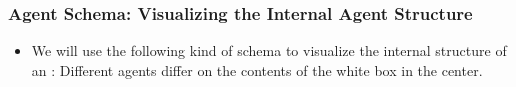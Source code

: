 \documentclass[notes,mh]{mikoslides}
\begin{document}
\begin{module}[id=agent-schema]

\begin{frame}
  \frametitle{Agent Schema: Visualizing the Internal Agent Structure}
  \begin{itemize}
  \item 
    \begin{omtext}[title=Agent Schema]
      We will use the following kind of schema to visualize the internal structure of an
      : 
      Different agents differ on the contents of the white box in the center. 
    \end{omtext}
  \end{itemize}
\end{frame}
\end{module}
\end{document}
